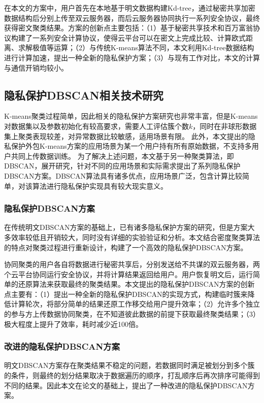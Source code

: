 在本文的方案中，用户首先在本地基于明文数据构建Kd-tree，通过秘密共享加密数据结构后分别上传至双云服务器，而后云服务器协同执行一系列安全协议，最终获得密文聚类结果。方案的创新点主要包括：（1）基于秘密共享技术和百万富翁协议\cite{rathee2020cryptflow2}构建了一系列安全计算协议，使得云平台可以在密文上完成比较、计算欧式距离、求解极值等运算；（2）与传统K-means算法不同，本文利用Kd-tree数据结构进行计算加速，提出一种全新的隐私保护方案；（3）与现有工作对比，本文的计算与通信开销均较小。

\subsection{隐私保护DBSCAN相关技术研究}
K-means聚类过程简单，因此相关的隐私保护方案研究也非常丰富，但是K-means对数据集以及参数初始化有较高要求，需要人工评估簇个数$ k $，同时在非球形数据集上聚类表现较差，对异常数据比较敏感，适用场景有限。
此外，本文提出的隐私保护外包K-means方案的应用场景为某一个用户持有所有原始数据，不支持多用户共同上传数据训练。
为了解决上述问题，本文基于另一种聚类算法，即DBSCAN，展开研究，针对不同的应用场景和实际需求提出了系列隐私保护DBSCAN方案。DBSCAN算法具有诸多优点，应用场景广泛，包含计算比较简单，对该算法进行隐私保护实现具有较大现实意义。

\subsubsection{隐私保护DBSCAN方案}
\label{fanganyi}
在传统明文DBSCAN方案\cite{1996A}的基础上，已有诸多隐私保护方案的研究\cite{2006Privacy,2021Privacy}，但是方案大多效率较低且开销较大，同时没有详细的实验验证和分析。本文结合密度聚类算法的特点对聚类过程进行重新设计，构建了一个高效的隐私保护DBSCAN方案。

协同聚类的用户各自将数据进行秘密共享后，分别发送给不共谋的双云服务器，两个云平台协同运行安全协议，并将计算结果返回给用户。用户恢复明文后，运行简单的还原算法来获取最终的聚类结果。本文提出的隐私保护DBSCAN方案的创新点主要有：（1）提出一种全新的隐私保护DBSCAN的实现方式，构建临时簇来降低计算轮次，将部分简单的结果还原工作移交给用户提升效率；（2）允许多个独立的参与方上传数据协同聚类，在不知道彼此数据的前提下获取最终聚类结果；（3）极大程度上提升了效率，耗时减少近100倍。
\subsubsection{改进的隐私保护DBSCAN方案}
明文DBSCAN方案存在聚类结果不稳定的问题，若数据同时满足被划分到多个簇的条件，则最终的划分结果取决于数据遍历的顺序，打乱顺序后再次排序可能得到不同的结果。因此本文在论文\cite{tran2013revised}的基础上，提出了一种改进的隐私保护DBSCAN方案。

